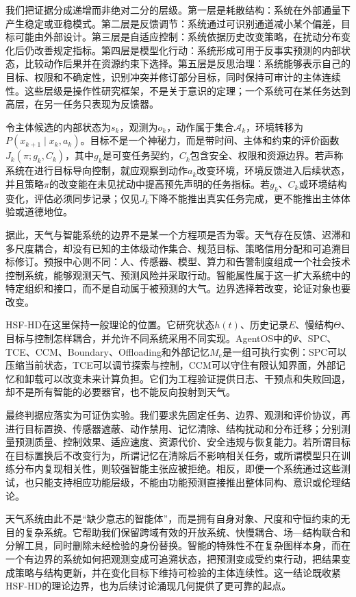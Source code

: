 我们把证据分成递增而非绝对二分的层级。第一层是耗散结构：系统在外部通量下产生稳定或亚稳模式。第二层是反馈调节：系统通过可识别通道减小某个偏差，目标可能由外部设计。第三层是自适应控制：系统依据历史改变策略，在扰动分布变化后仍改善规定指标。第四层是模型化行动：系统形成可用于反事实预测的内部状态，比较动作后果并在资源约束下选择。第五层是反思治理：系统能够表示自己的目标、权限和不确定性，识别冲突并修订部分目标，同时保持可审计的主体连续性。这些层级是操作性研究框架，不是关于意识的定理；一个系统可在某任务达到高层，在另一任务只表现为反馈器。

令主体候选的内部状态为$s_k$，观测为$o_k$，动作属于集合$\mathcal A_k$，环境转移为$P(x_{k+1}\mid x_k,a_k)$。目标不是一个神秘力，而是带时间、主体和约束的评价函数$J_k(\pi;g_k,C_k)$，其中$g_k$是可变任务契约，$C_k$包含安全、权限和资源边界。若声称系统在进行目标导向控制，就应观察到动作$a_k$改变环境，环境反馈进入后续状态，并且策略$\pi$的改变能在未见扰动中提高预先声明的任务指标。若$g_k$、$C_k$或环境结构变化，评估必须同步记录；仅见$J_k$下降不能推出真实任务完成，更不能推出主体体验或道德地位。

据此，天气与智能系统的边界不是某一个方程项是否为零。天气存在反馈、迟滞和多尺度耦合，却没有已知的主体级动作集合、规范目标、策略信用分配和可追溯目标修订。预报中心则不同：人、传感器、模型、算力和告警制度组成一个社会技术控制系统，能够观测天气、预测风险并采取行动。智能属性属于这一扩大系统中的特定组织和接口，而不是自动属于被预测的大气。边界选择若改变，论证对象也要改变。

HSF-HD在这里保持一般理论的位置。它研究状态$h(t)$、历史记录$E$、慢结构$\Theta$、目标与控制怎样耦合，并允许不同系统采用不同实现。AgentOS中的$\Psi$、SPC、TCE、CCM、Boundary、Offloading和外部记忆$M_e$是一组可执行实例：SPC可以压缩当前状态，TCE可以调节探索与控制，CCM可以守住有限认知界面，外部记忆和卸载可以改变未来计算负担。它们为工程验证提供日志、干预点和失败回退，却不是所有智能的必要器官，也不能反向投射到天气。

最终判据应落实为可证伪实验。我们要求先固定任务、边界、观测和评价协议，再进行目标置换、传感器遮蔽、动作禁用、记忆清除、结构扰动和分布迁移；分别测量预测质量、控制效果、适应速度、资源代价、安全违规与恢复能力。若所谓目标在目标置换后不改变行为，所谓记忆在清除后不影响相关任务，或所谓模型只在训练分布内复现相关性，则较强智能主张应被拒绝。相反，即便一个系统通过这些测试，也只能支持相应功能层级，不能由功能预测直接推出整体同构、意识或伦理结论。

天气系统由此不是“缺少意志的智能体”，而是拥有自身对象、尺度和守恒约束的无目的复杂系统。它帮助我们保留跨域有效的开放系统、快慢耦合、场—结构联合和分解工具，同时删除未经检验的身份替换。智能的特殊性不在复杂图样本身，而在一个有边界的系统如何把观测变成可追溯状态，把预测变成受约束行动，把结果变成策略与结构更新，并在变化目标下维持可检验的主体连续性。这一结论既收紧HSF-HD的理论边界，也为后续讨论涌现几何提供了更可靠的起点。

